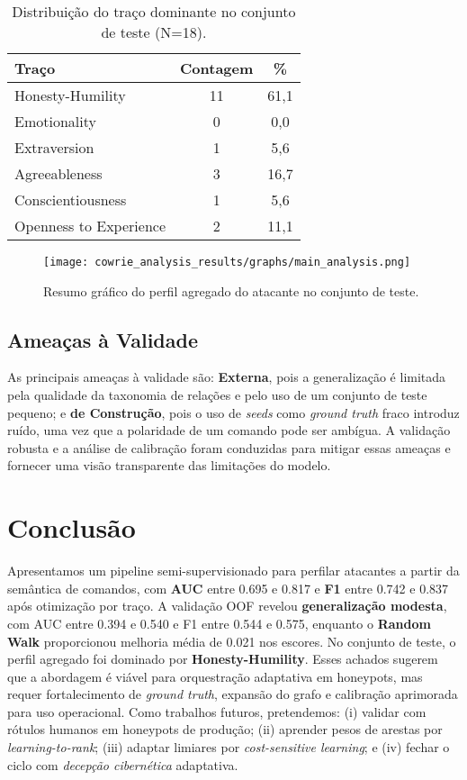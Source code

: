 \documentclass[12pt]{article}
\begin{document}
\begin{table}[H]
\centering
\caption{Distribuição do traço dominante no conjunto de teste (N=18).}
\label{tab:distribution}
\begin{tabular}{lcc}
\hline
Traço & Contagem & \% \\
\hline
Honesty-Humility & 11 & 61,1 \\
Emotionality & 0 & 0,0 \\
Extraversion & 1 & 5,6 \\
Agreeableness & 3 & 16,7 \\
Conscientiousness & 1 & 5,6 \\
Openness to Experience & 2 & 11,1 \\
\hline
\end{tabular}
\end{table}

\begin{figure}[H]
\centering
\texttt{[image: cowrie\_analysis\_results/graphs/main\_analysis.png]}
\caption{Resumo gráfico do perfil agregado do atacante no conjunto de teste.}
\label{fig:perfil}
\end{figure}

\subsection{Ameaças à Validade}

As principais ameaças à validade são: \textbf{Externa}, pois a generalização é limitada pela qualidade da taxonomia de relações e pelo uso de um conjunto de teste pequeno; e \textbf{de Construção}, pois o uso de \textit{seeds} como \textit{ground truth} fraco introduz ruído, uma vez que a polaridade de um comando pode ser ambígua. A validação robusta e a análise de calibração foram conduzidas para mitigar essas ameaças e fornecer uma visão transparente das limitações do modelo.

\section{Conclusão}
Apresentamos um pipeline semi-supervisionado para perfilar atacantes a partir da semântica de comandos, com \textbf{AUC} entre 0.695 e 0.817 e \textbf{F1} entre 0.742 e 0.837 após otimização por traço. A validação OOF revelou \textbf{generalização modesta}, com AUC entre 0.394 e 0.540 e F1 entre 0.544 e 0.575, enquanto o \textbf{Random Walk} proporcionou melhoria média de 0.021 nos escores. No conjunto de teste, o perfil agregado foi dominado por \textbf{Honesty-Humility}. Esses achados sugerem que a abordagem é viável para orquestração adaptativa em honeypots, mas requer fortalecimento de \textit{ground truth}, expansão do grafo e calibração aprimorada para uso operacional. Como trabalhos futuros, pretendemos: (i) validar com rótulos humanos em honeypots de produção; (ii) aprender pesos de arestas por \emph{learning-to-rank}; (iii) adaptar limiares por \emph{cost-sensitive learning}; e (iv) fechar o ciclo com \emph{decepção cibernética} adaptativa.
\end{document}
